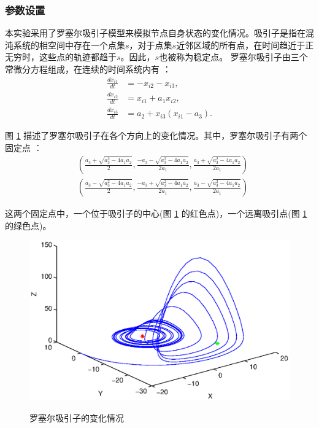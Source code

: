 \subsubsection{参数设置}
本实验采用了罗塞尔吸引子模型来模拟节点自身状态的变化情况。吸引子是指在混沌系统的相空间中存在一个点集$ s $，对于点集$ s $近邻区域的所有点，在时间趋近于正无穷时，这些点的轨迹都趋于$ s $。因此，$ s $也被称为稳定点。
罗塞尔吸引子由三个常微分方程组成，在连续的时间系统内有 \cite{Roessler1976}：
\begin{equation}
\begin{aligned}
\frac{d{x}_{i1}}{dt}&=-x_{i2}-x_{i3},
\\
\frac{d{x}_{i2}}{dt}&=x_{i1}+a_1x_{i2},
\\
\frac{d{x}_{i3}}{dt}&=a_2+x_{i3}(x_{i1}-a_3).
\end{aligned}
\label{Eq: Rossler_variation}
\end{equation}

图 \ref{Fig： rossler三维} 描述了罗塞尔吸引子在各个方向上的变化情况。其中，罗塞尔吸引子有两个固定点 \cite{Agiza2001}：
\begin{equation}
\begin{aligned}
&(\frac{a_3+\sqrt{a_3^2-4a_1a_2}}{2}, \frac{-a_3-\sqrt{a_3^2-4a_1a_2}}{2a_1}, \frac{a_3+\sqrt{a_3^2-4a_1a_2}}{2a_1})\\
&(\frac{a_3-\sqrt{a_3^2-4a_1a_2}}{2}, \frac{-a_3+\sqrt{a_3^2-4a_1a_2}}{2a_1}, \frac{a_3-\sqrt{a_3^2-4a_1a_2}}{2a_1})
\end{aligned}
\end{equation}

这两个固定点中，一个位于吸引子的中心(图 \ref{Fig： rossler三维} 的红色点)，一个远离吸引点(图 \ref{Fig： rossler三维} 的绿色点)。


\begin{figure}[ht]%
	\centering
	\includegraphics[width=0.7\columnwidth]{chapter3Fig/3d.eps}\\
	\caption{罗塞尔吸引子的变化情况}\label{Fig： rossler三维}	
	
\end{figure}

